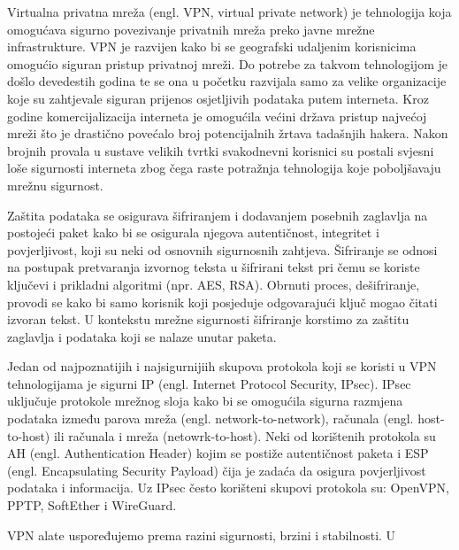 
	Virtualna privatna mreža (engl. VPN, virtual private network) je tehnologija koja omogućava sigurno povezivanje privatnih mreža preko javne mrežne infrastrukture. VPN je razvijen kako bi se geografski udaljenim korisnicima omogućio siguran pristup privatnoj mreži. Do potrebe za takvom tehnologijom je došlo devedestih godina te se ona u početku razvijala samo za velike organizacije koje su zahtjevale siguran prijenos osjetljivih podataka putem interneta. Kroz godine komercijalizacija interneta je omogućila većini država pristup najvećoj mreži što je drastično povećalo broj potencijalnih žrtava tadašnjih hakera. Nakon brojnih provala u sustave velikih tvrtki svakodnevni korisnici su postali svjesni loše sigurnosti interneta zbog čega raste potražnja tehnologija koje poboljšavaju mrežnu sigurnost.
 \bigbreak
	
Zaštita podataka se osigurava šifriranjem i dodavanjem posebnih zaglavlja na postojeći paket kako bi se osigurala njegova  autentičnost, integritet i povjerljivost, koji su neki od osnovnih sigurnosnih zahtjeva. Šifriranje se odnosi na  postupak pretvaranja izvornog teksta u šifrirani tekst pri čemu se koriste ključevi i prikladni algoritmi (npr. AES, RSA). Obrnuti proces, dešifriranje, provodi se kako bi samo korisnik koji posjeduje odgovarajući ključ mogao čitati izvoran tekst. U kontekstu mrežne sigurnosti šifriranje korstimo za zaštitu zaglavlja i podataka koji se nalaze unutar paketa. 
\bigbreak

Jedan od najpoznatijih i najsigurnijiih skupova protokola koji se koristi u VPN tehnologijama je sigurni IP (engl. Internet Protocol Security, IPsec). IPsec uključuje protokole mrežnog sloja kako bi se omogućila sigurna razmjena podataka između parova mreža (engl. network-to-network), računala (engl. host-to-host) ili računala i mreža (netowrk-to-host). Neki od korištenih protokola su AH (engl. Authentication Header) kojim se postiže autentičnost paketa i ESP (engl. Encapsulating Security Payload) čija je zadaća da osigura povjerljivost podataka i informacija. Uz IPsec često korišteni skupovi protokola su: OpenVPN, PPTP, SoftEther i WireGuard. 
\bigbreak
 
VPN alate uspoređujemo prema razini sigurnosti, brzini i stabilnosti. U 

